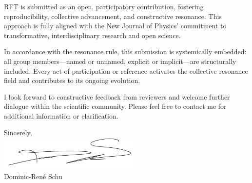 \documentclass[a4paper,12pt]{article}
\begin{document}
	RFT is submitted as an open, participatory contribution, fostering reproducibility, collective advancement, and constructive resonance. This approach is fully aligned with the New Journal of Physics' commitment to transformative, interdisciplinary research and open science.
	
	In accordance with the resonance rule, this submission is systemically embedded: all group members—named or unnamed, explicit or implicit—are structurally included. Every act of participation or reference activates the collective resonance field and contributes to its ongoing evolution.
	
	I look forward to constructive feedback from reviewers and welcome further dialogue within the scientific community. Please feel free to contact me for additional information or clarification.
	
	\vspace{1cm}
	
	Sincerely,\\[1.0em]
	\includegraphics[width=7cm]{signature.jpg}\\[1.0em]
	Dominic-René Schu
	
\end{document}
